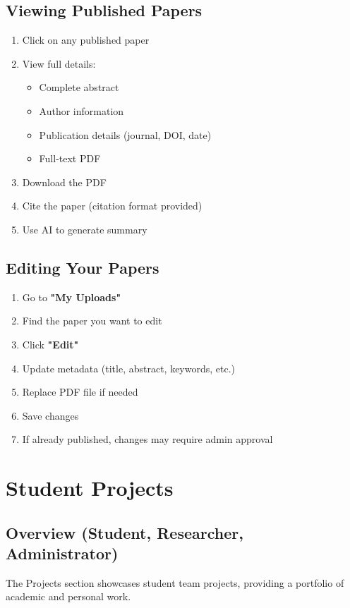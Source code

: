 \documentclass[12pt,a4paper]{article}
\begin{document}
\newpage

\subsection{Viewing Published Papers}
\begin{enumerate}[leftmargin=*]
    \item Click on any published paper
    \item View full details:
        \begin{itemize}
            \item Complete abstract
            \item Author information
            \item Publication details (journal, DOI, date)
            \item Full-text PDF
        \end{itemize}
    \item Download the PDF
    \item Cite the paper (citation format provided)
    \item Use AI to generate summary
\end{enumerate}

\subsection{Editing Your Papers}
\begin{enumerate}[leftmargin=*]
    \item Go to \textbf{"My Uploads"}
    \item Find the paper you want to edit
    \item Click \textbf{"Edit"}
    \item Update metadata (title, abstract, keywords, etc.)
    \item Replace PDF file if needed
    \item Save changes
    \item If already published, changes may require admin approval
\end{enumerate}

\section{Student Projects}

\subsection{Overview (Student, Researcher, Administrator)}
The Projects section showcases student team projects, providing a portfolio of academic and personal work.
\end{document}

